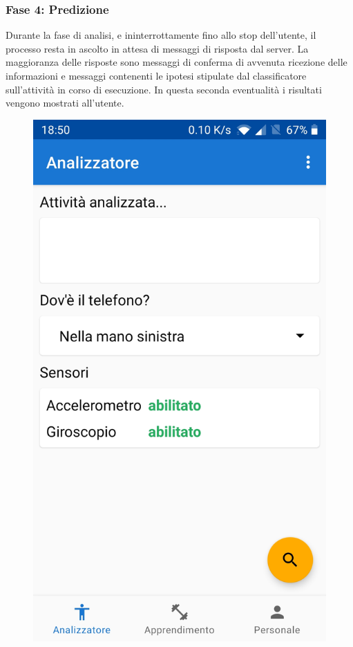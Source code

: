 \subsubsection{Fase 4: Predizione}
Durante la fase di analisi, e ininterrottamente fino allo stop dell'utente, il processo resta in ascolto in attesa di 
messaggi di risposta dal server.
La maggioranza delle risposte sono messaggi di conferma di avvenuta ricezione delle informazioni e messaggi contenenti 
le ipotesi stipulate dal classificatore sull'attività in corso di esecuzione.
In questa seconda eventualità i risultati vengono mostrati all'utente.
\begin{figure}[H]
    \centering
    \includegraphics[scale = 0.1019]{assets/images/screenshots/1a_Init.jpg}

\end{figure}
